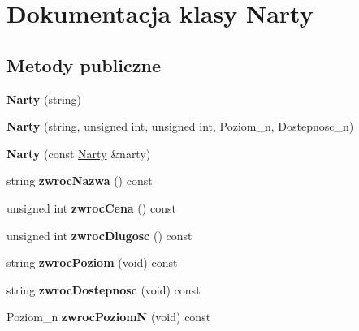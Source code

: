 \hypertarget{class_narty}{}\section{Dokumentacja klasy Narty}
\label{class_narty}
\subsection*{Metody publiczne}
\begin{DoxyCompactItemize}
\item 
\mbox{\label{class_narty_a0e97c71362fec6e6495f35750e1c45d2}} 
{\bfseries Narty} (string)
\item 
\mbox{\label{class_narty_a061922fefe4e2cc8da8daf66ce0070fd}} 
{\bfseries Narty} (string, unsigned int, unsigned int, Poziom\+\_\+n, Dostepnosc\+\_\+n)
\item 
\mbox{\label{class_narty_af5629023cde81ccb70cef0d02d315347}} 
{\bfseries Narty} (const \hyperlink{class_narty}{Narty} \&narty)
\item 
\mbox{\label{class_narty_a704912bf1923302796ed7465678d4664}} 
string {\bfseries zwroc\+Nazwa} () const
\item 
\mbox{\label{class_narty_a417482bac2097c29ce9c74c721ba7854}} 
unsigned int {\bfseries zwroc\+Cena} () const
\item 
\mbox{\label{class_narty_a16205402be7796d3bbdbb9b7eb34507f}} 
unsigned int {\bfseries zwroc\+Dlugosc} () const
\item 
\mbox{\label{class_narty_a9e9f486ea6e7aee2b3ea765bb8c126c1}} 
string {\bfseries zwroc\+Poziom} (void) const
\item 
\mbox{\label{class_narty_a81d3658a9d8f0db31e469516efd7e7a3}} 
string {\bfseries zwroc\+Dostepnosc} (void) const
\item 
\mbox{\label{class_narty_a28ea4239352274779d53b5ecaf137fff}} 
Poziom\+\_\+n {\bfseries zwroc\+PoziomN} (void) const
\item 
\mbox{\label{class_narty_a72e89246e4552434b12d514f80a60e64}} 

\end{DoxyCompactItemize}

